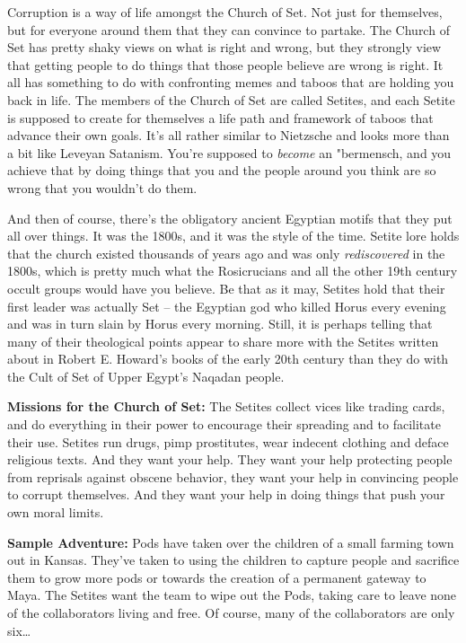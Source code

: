 Corruption is a way of life amongst the Church of Set. Not just for themselves, but for everyone around them that they can convince to partake. The Church of Set has pretty shaky views on what is right and wrong, but they strongly view that getting people to do things that those people believe are wrong is right. It all has something to do with confronting memes and taboos that are holding you back in life. The members of the Church of Set are called Setites, and each Setite is supposed to create for themselves a life path and framework of taboos that advance their own goals. It's all rather similar to Nietzsche and looks more than a bit like Leveyan Satanism. You're supposed to \textit{become} an "bermensch, and you achieve that by doing things that you and the people around you think are so wrong that you wouldn't do them.

And then of course, there's the obligatory ancient Egyptian motifs that they put all over things. It was the 1800s, and it was the style of the time. Setite lore holds that the church existed thousands of years ago and was only \textit{rediscovered} in the 1800s, which is pretty much what the Rosicrucians and all the other 19th century occult groups would have you believe. Be that as it may, Setites hold that their first leader was actually Set -- the Egyptian god who killed Horus every evening and was in turn slain by Horus every morning. Still, it is perhaps telling that many of their theological points appear to share more with the Setites written about in Robert E. Howard's books of the early 20th century than they do with the Cult of Set of Upper Egypt's Naqadan people.

\textbf{Missions for the Church of Set:} The Setites collect vices like trading cards, and do everything in their power to encourage their spreading and to facilitate their use. Setites run drugs, pimp prostitutes, wear indecent clothing and deface religious texts. And they want your help. They want your help protecting people from reprisals against obscene behavior, they want your help in convincing people to corrupt themselves. And they want your help in doing things that push your own moral limits.

\textbf{Sample Adventure:} Pods have taken over the children of a small farming town out in Kansas. They've taken to using the children to capture people and sacrifice them to grow more pods or towards the creation of a permanent gateway to Maya. The Setites want the team to wipe out the Pods, taking care to leave none of the collaborators living and free. Of course, many of the collaborators are only six\ldots{}

